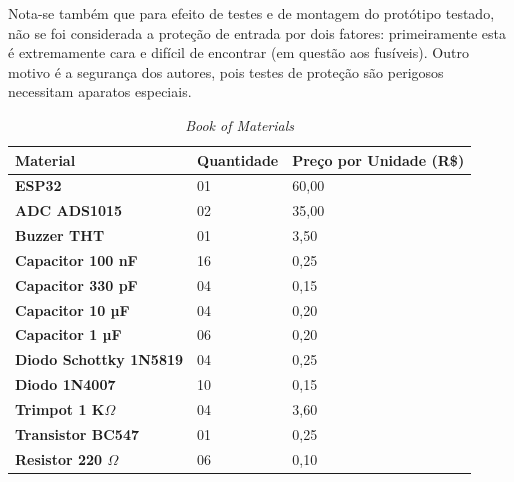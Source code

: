 Nota-se também que para efeito de testes e de montagem do protótipo testado, não se foi considerada a proteção de entrada por dois fatores: primeiramente esta é extremamente cara e difícil de encontrar (em questão aos fusíveis). Outro motivo é a segurança dos autores, pois testes de proteção são perigosos necessitam aparatos especiais.

\begin{table}[!ht]
    \centering
    \caption{\textit{Book of Materials}}
    \label{tab:Bookofmaterials}
    \begin{tabular}{|l|l|l|}
        \hline
        \textbf{Material}                      & \textbf{Quantidade} & \textbf{Preço por Unidade (R\$)} \\ \hline
        \textbf{ESP32}                         & 01                  & 60,00                            \\ \hline
        \textbf{ADC ADS1015}                   & 02                  & 35,00                            \\ \hline
        \textbf{Buzzer THT}                    & 01                  & 3,50                             \\ \hline
        \textbf{Capacitor 100 nF}              & 16                  & 0,25                             \\ \hline
        \textbf{Capacitor 330 pF}              & 04                  & 0,15                             \\ \hline
        \textbf{Capacitor 10 µF}               & 04                  & 0,20                             \\ \hline
        \textbf{Capacitor 1 µF}                & 06                  & 0,20                             \\ \hline
        \textbf{Diodo Schottky 1N5819}         & 04                  & 0,25                             \\ \hline
        \textbf{Diodo 1N4007}                  & 10                  & 0,15                             \\ \hline
        \textbf{Trimpot 1 K$\Omega$}           & 04                  & 3,60                             \\ \hline
        \textbf{Transistor BC547}              & 01                  & 0,25                             \\ \hline
        \textbf{Resistor 220 $\Omega$}         & 06                  & 0,10                             \\ \hline

\end{tabular}
\end{table}
